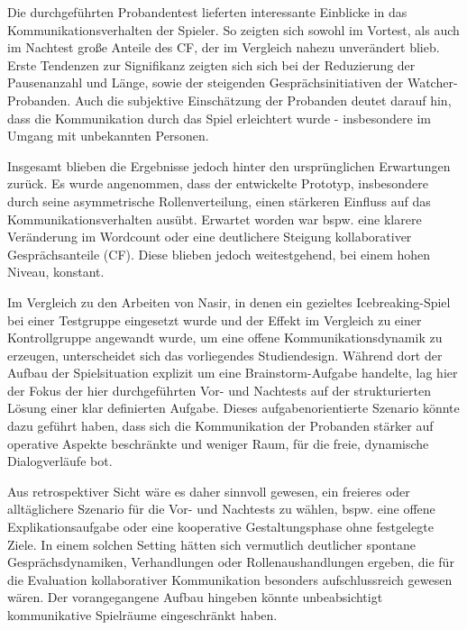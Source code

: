Die durchgeführten Probandentest lieferten interessante Einblicke in das Kommunikationsverhalten der Spieler. So zeigten sich sowohl im Vortest, als auch im Nachtest große Anteile des \ac{CF}, der im Vergleich nahezu unverändert blieb. Erste Tendenzen zur Signifikanz zeigten sich sich bei der Reduzierung der Pausenanzahl und Länge, sowie der steigenden Gesprächsinitiativen der Watcher-Probanden. Auch die subjektive Einschätzung der Probanden deutet darauf hin, dass die Kommunikation durch das Spiel erleichtert wurde - insbesondere im Umgang mit unbekannten Personen. 

Insgesamt blieben die Ergebnisse jedoch hinter den ursprünglichen Erwartungen zurück. Es wurde angenommen, dass der entwickelte Prototyp, insbesondere durch seine asymmetrische Rollenverteilung, einen stärkeren Einfluss auf das Kommunikationsverhalten ausübt. Erwartet worden war bspw. eine klarere Veränderung im Wordcount oder eine deutlichere Steigung kollaborativer Gesprächsanteile (\ac{CF}). Diese blieben jedoch weitestgehend, bei einem hohen Niveau, konstant.

Im Vergleich zu den Arbeiten von Nasir, in denen ein gezieltes Icebreaking-Spiel bei einer Testgruppe eingesetzt wurde und der Effekt im Vergleich zu einer Kontrollgruppe angewandt wurde, um eine offene Kommunikationsdynamik zu erzeugen, unterscheidet sich das vorliegendes Studiendesign. Während dort der Aufbau der Spielsituation explizit um eine Brainstorm-Aufgabe handelte, lag hier der Fokus der hier durchgeführten Vor- und Nachtests auf der strukturierten Lösung einer klar definierten Aufgabe. Dieses aufgabenorientierte Szenario könnte dazu geführt haben, dass sich die Kommunikation der Probanden stärker auf operative Aspekte beschränkte und weniger Raum, für die freie, dynamische Dialogverläufe bot. 

Aus retrospektiver Sicht wäre es daher sinnvoll gewesen, ein freieres oder alltäglichere Szenario für die Vor- und Nachtests zu wählen, bspw. eine offene Explikationsaufgabe oder eine kooperative Gestaltungsphase ohne festgelegte Ziele. In einem solchen Setting hätten sich vermutlich deutlicher spontane Gesprächsdynamiken, Verhandlungen oder Rollenaushandlungen ergeben, die für die Evaluation kollaborativer Kommunikation besonders aufschlussreich gewesen wären. Der vorangegangene Aufbau hingeben könnte unbeabsichtigt kommunikative Spielräume eingeschränkt haben.


